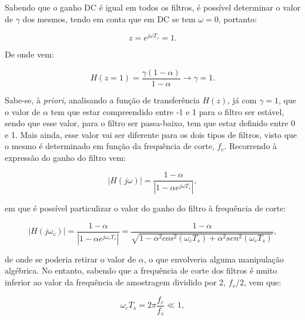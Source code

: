 \documentclass[11pt]{article}
\numberwithin{equation}{section}
\begin{document}
Sabendo que o ganho DC é igual em todos os filtros, é possível determinar o valor de $\gamma$ dos mesmos, tendo em conta que em DC se tem $\omega = 0$, portanto:

\vspace{-3mm}
\begin{equation}
	z = e^{j \omega T_s} = 1.
\end{equation}

\vspace{1mm}
De onde vem:

\vspace{-3mm}
\begin{equation}
	H(z = 1) = \frac{\gamma(1-\alpha)}{1-\alpha} \longrightarrow \gamma = 1.
\end{equation} 

\vspace{1mm}
Sabe-se, à \textit{priori}, analisando a função de transferência $H(z)$, já com $\gamma = 1$, que o valor de $\alpha$ tem que estar compreendido entre -1 e 1 para o filtro ser estável, sendo que esse valor, para o filtro ser passa-baixo, tem que estar definido entre 0 e 1. Mais ainda, esse valor vai ser diferente para os dois tipos de filtros, visto que o mesmo é determinado em função da frequência de corte, \textit{$f_c$}. Recorrendo à expressão do ganho do filtro vem:

\vspace{-3mm}
\begin{equation}
	|H(j\omega)| = \frac{1-\alpha}{|1-\alpha e^{j\omega T_s}|},
\end{equation} 

\vspace{1mm}
em que é possível particulizar o valor do ganho do filtro à frequência de corte:

\vspace{-3mm}
\begin{equation}
	|H(j\omega_c)| = \frac{1-\alpha}{|1-\alpha e^{j\omega_c T_s}|} = \frac{1 - \alpha}{\sqrt{1- \alpha^2 cos^2{(\omega_c T_s)} + \alpha^2 sen^2{(\omega_c T_s)}}},
\end{equation} 

\vspace{1mm}
de onde se poderia retirar o valor de $\alpha$, o que envolveria alguma manipulação algébrica. No entanto, sabendo que a frequência de corte dos filtros é muito inferior ao valor da frequência de amostragem dividido por 2, $f_s/2$, vem que:

\vspace{-3mm}
\begin{equation}
\omega_ c T_s = 2\pi \frac{f_c}{f_s} \ll 1,
\end{equation} 
\end{document}
